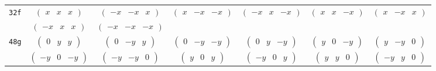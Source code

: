 \documentclass[fleqn,9pt,landscape]{jsarticle}
\begin{document}
\begin{center}
\begin{longtable}{ccccccc}
{\tt 32f} & $ \begin{pmatrix} x & x & x \end{pmatrix} $ & $ \begin{pmatrix} - x & - x & x \end{pmatrix} $ & $ \begin{pmatrix} x & - x & - x \end{pmatrix} $ & $ \begin{pmatrix} - x & x & - x \end{pmatrix} $ & $ \begin{pmatrix} x & x & - x \end{pmatrix} $ & $ \begin{pmatrix} x & - x & x \end{pmatrix} $ \\
& $ \begin{pmatrix} - x & x & x \end{pmatrix} $ & $ \begin{pmatrix} - x & - x & - x \end{pmatrix} $ & $  $ & $  $ & $  $ & $  $ \\ \hline
{\tt 48g} & $ \begin{pmatrix} 0 & y & y \end{pmatrix} $ & $ \begin{pmatrix} 0 & - y & y \end{pmatrix} $ & $ \begin{pmatrix} 0 & - y & - y \end{pmatrix} $ & $ \begin{pmatrix} 0 & y & - y \end{pmatrix} $ & $ \begin{pmatrix} y & 0 & - y \end{pmatrix} $ & $ \begin{pmatrix} y & - y & 0 \end{pmatrix} $ \\
& $ \begin{pmatrix} - y & 0 & - y \end{pmatrix} $ & $ \begin{pmatrix} - y & - y & 0 \end{pmatrix} $ & $ \begin{pmatrix} y & 0 & y \end{pmatrix} $ & $ \begin{pmatrix} - y & 0 & y \end{pmatrix} $ & $ \begin{pmatrix} y & y & 0 \end{pmatrix} $ & $ \begin{pmatrix} - y & y & 0 \end{pmatrix} $ \\ \hline

\end{longtable}
\end{center}
\end{document}
